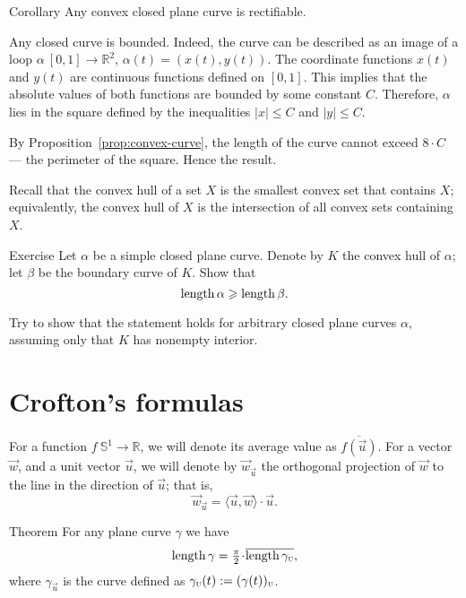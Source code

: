 \begin{thm}{Corollary}\label{cor:convex=>rectifiable}
Any convex closed plane curve is rectifiable.  
\end{thm}

Any closed curve is bounded.
Indeed, the curve can be described as an image of a loop $\alpha\:[0,1]\to\mathbb{R}^2$, $\alpha(t)=(x(t),y(t))$.
The coordinate functions $x(t)$ and $y(t)$ are continuous functions defined on $[0,1]$.
This implies that the absolute values of both functions are bounded by some constant $C$.
Therefore, $\alpha$ lies in the square defined by the inequalities $|x|\le C$ and $|y|\le C$.


By Proposition~\ref{prop:convex-curve}, the length of the curve cannot exceed $8\cdot C$ --- the perimeter of the square. 
Hence the result.
\qeds

Recall that the convex hull of a set $X$ is the smallest convex set that contains $X$; equivalently, the convex hull of $X$ is the intersection of all convex sets containing $X$.

\begin{thm}{Exercise}\label{ex:convex-hull}
Let $\alpha$ be a simple closed plane curve.
Denote by $K$ the convex hull of $\alpha$; let $\beta$ be the boundary curve of $K$.
Show that 
\[\mathop{\rm length}\nolimits \alpha\geqslant \mathop{\rm length}\nolimits \beta.\]

Try to show that the statement holds for arbitrary closed plane curves $\alpha$, assuming only that $K$ has nonempty interior.
\end{thm}


\section{Crofton's formulas}
\label{sec:crofton}

For a function $f\: \mathbb{S}^1 \to \mathbb{R}$, we will denote its average value as $\overline{f(\vec u)}$.
For a vector $\vec w$, and a unit vector $\vec u$, we will denote by $\vec w_{\vec u}$ the orthogonal projection of $\vec w$ to the line in the direction of  $\vec u$;
that is,
\[\vec w_{\vec u}=\langle\vec u,\vec w\rangle\cdot\vec u.\] 

\begin{thm}{Theorem}
For any plane curve $\gamma$ we have
\[
\length\gamma
=\tfrac\pi2\cdot \overline{\length\gamma_{\vec u}},
\]
where $\gamma_{\vec u}$ is the curve defined as $\gamma_{\text{\sc{u}}}(t) \mathrel{:=} (\gamma (t))_{\text{\sc{u}}}$.
\end{thm}


